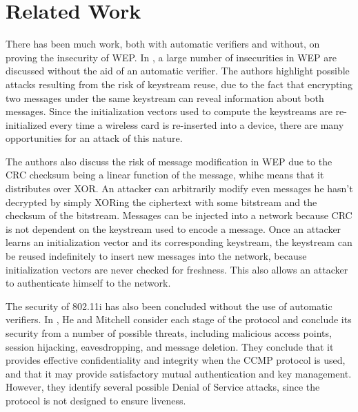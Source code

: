 \documentclass[11pt, twocolumn]{article} %
\begin{document}
\section{Related Work}
\label{sec:Related Work}
There has been much work, both with automatic verifiers and without, on proving the insecurity of WEP.  In \cite{borisov01}, a large number of insecurities in WEP are discussed without the aid of an automatic verifier.  The authors highlight possible attacks resulting from the risk of keystream reuse, due to the fact that encrypting two messages under the same keystream can reveal information about both messages.  Since the initialization vectors used to compute the keystreams are re-initialized every time a wireless card is re-inserted into a device, there are many opportunities for an attack of this nature.  

The authors also discuss the risk of message modification in WEP due to the CRC checksum being a linear function of the message, whihc means that it distributes over XOR.  An attacker can arbitrarily modify even messages he hasn't decrypted by simply XORing the ciphertext with some bitstream and the checksum of the bitstream.  Messages can be injected into a network because CRC is not dependent on the keystream used to encode a message. Once an attacker learns an initialization vector and its corresponding keystream, the keystream can be reused indefinitely to insert new messages into the network, because initialization vectors are never checked for freshness.  This also allows an attacker to authenticate himself to the network.  

The security of 802.11i has also been concluded without the use of automatic verifiers.  In \cite{he05}, He and Mitchell consider each stage of the protocol and conclude its security from a number of possible threats, including malicious access points, session hijacking, eavesdropping, and message deletion.  They conclude that it provides effective confidentiality and integrity when the CCMP protocol is used, and that it may provide satisfactory mutual authentication and key management.  However, they identify several possible Denial of Service attacks, since the protocol is not designed to ensure liveness.
\end{document}
